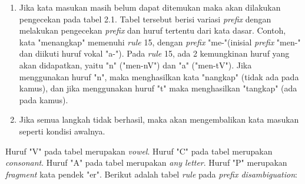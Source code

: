 \begin{enumerate}[leftmargin=*]
\begin{enumerate}[label={\arabic*},leftmargin=*]
	\end{enumerate}
	\item Jika kata masukan\textit{ }masih belum dapat ditemukan maka akan 
	dilakukan pengecekan pada tabel 2.1. Tabel tersebut berisi variasi 
	\textit{prefix} dengan melakukan pengecekan \textit{prefix }dan 
	huruf tertentu dari kata dasar. Contoh, kata "menangkap" memenuhi 
	\textit{rule }15, dengan \textit{prefix }"me-"(inisial \textit{prefix }"men-" dan diikuti huruf vokal "a-"). Pada \textit{rule }15, ada 2 kemungkinan huruf yang akan didapatkan, yaitu "n" ("men-nV") dan "a" ("men-tV"). Jika menggunakan huruf "n", maka	menghasilkan kata "nangkap" (tidak ada pada kamus), dan jika menggunakan huruf "t" maka menghasilkan "tangkap" (ada pada kamus).
	\item Jika semua langkah tidak berhasil, maka akan mengembalikan kata masukan seperti kondisi awalnya.
\end{enumerate}
Huruf "V" pada tabel merupakan \textit{vowel}. Huruf "C" pada 
tabel merupakan \textit{consonant}.\textit{ }Huruf "A" pada tabel 
merupakan \textit{any letter}. Huruf "P" merupakan \textit{
	fragment }kata pendek "er". Berikut adalah tabel \textit{rule} pada 
\textit{prefix disambiguation}:
